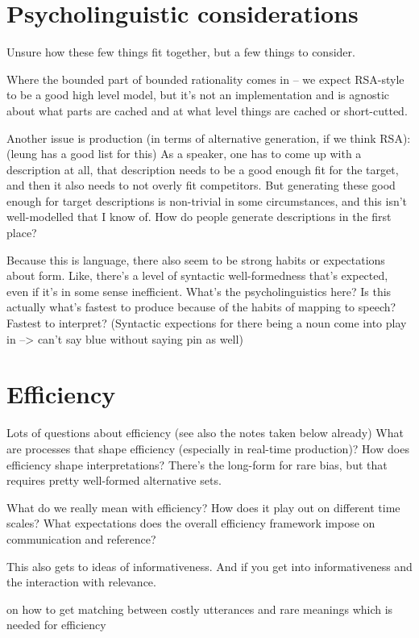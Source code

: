 \documentclass[]{article}
\begin{document}
\section{Psycholinguistic considerations}
Unsure how these few things fit together, but a few things to consider.

Where the bounded part of bounded rationality comes in -- we expect RSA-style to be a good high level model, but it's not an implementation and is agnostic about what parts are cached and at what level things are cached or short-cutted. 

Another issue is production (in terms of alternative generation, if we think RSA): (leung has a good list for this) As a speaker, one has to come up with a description at all, that description needs to be a good enough fit for the target, and then it also needs to not overly fit competitors. But generating these good enough for target descriptions is non-trivial in some circumstances, and this isn't well-modelled that I know of. How do people generate descriptions in the first place? 

Because this is language, there also seem to be strong habits or expectations about form. Like, there's a level of syntactic well-formedness that's expected, even if it's in some sense inefficient. What's the psycholinguistics here? Is this actually what's fastest to produce because of the habits of mapping to speech? Fastest to interpret? (Syntactic expections for there being a noun come into play in \cite{degen20200406} --> can't say blue without saying pin as well) 

\section{Efficiency}
Lots of questions about efficiency (see also the notes taken below already)
What are processes that shape efficiency (especially in real-time production)? How does efficiency shape interpretations? There's the long-form for rare bias, but that requires pretty well-formed alternative sets. 

What do we really mean with efficiency? How does it play out on different time scales? What expectations does the overall efficiency framework impose on communication and reference? 

This also gets to ideas of informativeness. And if you get into informativeness and the interaction with relevance. 

\cite{bergen} on how to get matching between costly utterances and rare meanings which is needed for efficiency
\end{document}
